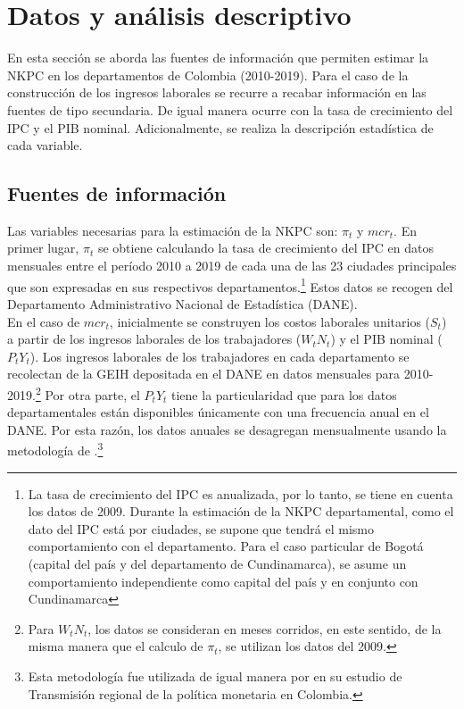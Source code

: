 \section{Datos y análisis descriptivo}
En esta sección se aborda las fuentes de información que permiten estimar la NKPC en los departamentos de Colombia (2010-2019). Para el caso de la construcción de los ingresos laborales se recurre a recabar información en las fuentes de tipo secundaria. De igual manera ocurre con la tasa de crecimiento del IPC y el PIB nominal. Adicionalmente, se realiza la descripción estadística de cada variable.
\subsection{Fuentes de información}
Las variables necesarias para la estimación de la NKPC son: 	$\pi_{t}$ y $mcr_{t}$. En primer lugar,  $\pi_{t}$ se obtiene calculando la tasa de crecimiento del IPC en datos mensuales entre el período 2010 a 2019 de cada una de las 23 ciudades principales que son expresadas en sus respectivos departamentos.\footnote{La tasa de crecimiento del IPC es anualizada, por lo tanto, se tiene en cuenta los datos de 2009. Durante la estimación de la NKPC departamental, como el dato del IPC está por ciudades, se supone que tendrá el mismo comportamiento con el departamento. Para el caso particular de Bogotá (capital del país y del departamento de Cundinamarca), se asume un comportamiento independiente como capital del país y en conjunto con Cundinamarca }  Estos datos se recogen del Departamento Administrativo Nacional de Estadística (DANE).\\

En el caso de $mcr_{t}$, inicialmente se construyen los costos laborales unitarios ($S_{t}$) a partir de los ingresos laborales de los trabajadores ($ W_{t}N_{t}$) y el PIB nominal ($P_{t}Y_{t}$). Los ingresos laborales de los trabajadores en cada departamento se recolectan de la GEIH depositada en el DANE en datos mensuales para 2010-2019.\footnote{Para $ W_{t}N_{t}$, los datos se consideran en meses corridos, en este sentido, de la misma manera que el calculo de $\pi_{t}$, se utilizan los datos del 2009.} Por otra parte, el $P_{t}Y_{t}$ tiene la particularidad que para los datos departamentales  están disponibles únicamente con una frecuencia anual en el DANE. Por esta razón, los datos anuales se desagregan mensualmente usando la metodología de \cite{chow1971best}.\footnote{ Esta metodología fue utilizada de igual manera por \cite{romero2008transmision} en su estudio de Transmisión regional  de la política monetaria en Colombia.} \\

